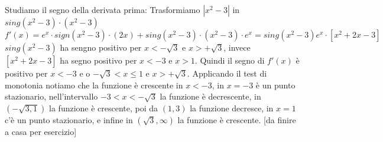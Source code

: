 Studiamo il segno della derivata prima:\newline
Trasformiamo $|x^2-3|$ in $sing(x^2-3) \cdot (x^2-3)$
\[
    f'(x) = e^x \cdot sign(x^2 - 3)\cdot (2x) + sing(x^2-3) \cdot (x^2-3) \cdot e^x = sing(x^2-3) e^x \cdot [x^2+2x -3]
\]
$sing(x^2-3)$ ha sengno positivo per $x< - \sqrt{3}$ e $x> +\sqrt{3}$, invece $[x^2+2x -3]$ ha segno positivo per $x < -3$ e $x > 1$.\newline
Quindi il segno di $ f'(x)$ è positivo per $x< -3$ e o
$-\sqrt{3} < x \leq 1$ e $x > +\sqrt{3}$.\newline
Applicando il test di monotonia notiamo che la funzione è crescente in $x< -3$, in $x =-3$ è un punto stazionario, nell'intervallo $-3< x < -\sqrt{3}$ la funzione è decrescente, in $(-\sqrt{3, 1})$ la funzione è crescente, poi da $(1,3)$ la funzione decresce, in $x=1$ c'è un punto stazionario, e infine in $(\sqrt{3}, \infty)$ la funzione è crescente.
[da finire a casa per esercizio]
\newpage